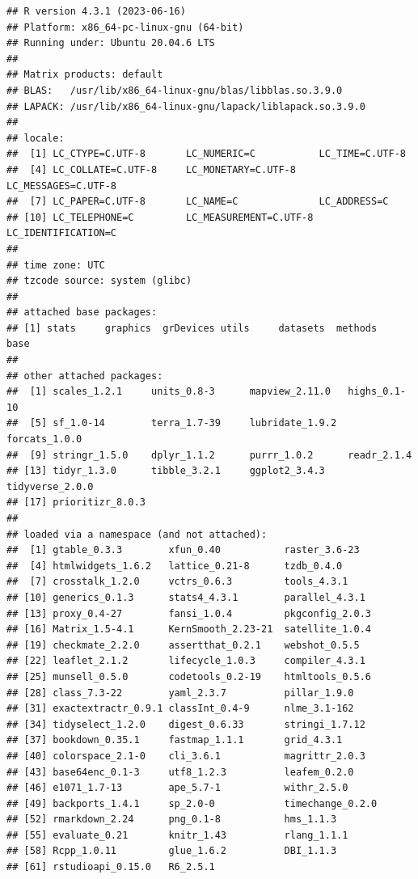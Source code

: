 \documentclass[
  12pt,
]{book}
\begin{document}
\begin{verbatim}
## R version 4.3.1 (2023-06-16)
## Platform: x86_64-pc-linux-gnu (64-bit)
## Running under: Ubuntu 20.04.6 LTS
## 
## Matrix products: default
## BLAS:   /usr/lib/x86_64-linux-gnu/blas/libblas.so.3.9.0 
## LAPACK: /usr/lib/x86_64-linux-gnu/lapack/liblapack.so.3.9.0
## 
## locale:
##  [1] LC_CTYPE=C.UTF-8       LC_NUMERIC=C           LC_TIME=C.UTF-8       
##  [4] LC_COLLATE=C.UTF-8     LC_MONETARY=C.UTF-8    LC_MESSAGES=C.UTF-8   
##  [7] LC_PAPER=C.UTF-8       LC_NAME=C              LC_ADDRESS=C          
## [10] LC_TELEPHONE=C         LC_MEASUREMENT=C.UTF-8 LC_IDENTIFICATION=C   
## 
## time zone: UTC
## tzcode source: system (glibc)
## 
## attached base packages:
## [1] stats     graphics  grDevices utils     datasets  methods   base     
## 
## other attached packages:
##  [1] scales_1.2.1     units_0.8-3      mapview_2.11.0   highs_0.1-10    
##  [5] sf_1.0-14        terra_1.7-39     lubridate_1.9.2  forcats_1.0.0   
##  [9] stringr_1.5.0    dplyr_1.1.2      purrr_1.0.2      readr_2.1.4     
## [13] tidyr_1.3.0      tibble_3.2.1     ggplot2_3.4.3    tidyverse_2.0.0 
## [17] prioritizr_8.0.3
## 
## loaded via a namespace (and not attached):
##  [1] gtable_0.3.3        xfun_0.40           raster_3.6-23      
##  [4] htmlwidgets_1.6.2   lattice_0.21-8      tzdb_0.4.0         
##  [7] crosstalk_1.2.0     vctrs_0.6.3         tools_4.3.1        
## [10] generics_0.1.3      stats4_4.3.1        parallel_4.3.1     
## [13] proxy_0.4-27        fansi_1.0.4         pkgconfig_2.0.3    
## [16] Matrix_1.5-4.1      KernSmooth_2.23-21  satellite_1.0.4    
## [19] checkmate_2.2.0     assertthat_0.2.1    webshot_0.5.5      
## [22] leaflet_2.1.2       lifecycle_1.0.3     compiler_4.3.1     
## [25] munsell_0.5.0       codetools_0.2-19    htmltools_0.5.6    
## [28] class_7.3-22        yaml_2.3.7          pillar_1.9.0       
## [31] exactextractr_0.9.1 classInt_0.4-9      nlme_3.1-162       
## [34] tidyselect_1.2.0    digest_0.6.33       stringi_1.7.12     
## [37] bookdown_0.35.1     fastmap_1.1.1       grid_4.3.1         
## [40] colorspace_2.1-0    cli_3.6.1           magrittr_2.0.3     
## [43] base64enc_0.1-3     utf8_1.2.3          leafem_0.2.0       
## [46] e1071_1.7-13        ape_5.7-1           withr_2.5.0        
## [49] backports_1.4.1     sp_2.0-0            timechange_0.2.0   
## [52] rmarkdown_2.24      png_0.1-8           hms_1.1.3          
## [55] evaluate_0.21       knitr_1.43          rlang_1.1.1        
## [58] Rcpp_1.0.11         glue_1.6.2          DBI_1.1.3          
## [61] rstudioapi_0.15.0   R6_2.5.1
\end{verbatim}

  
\end{document}
